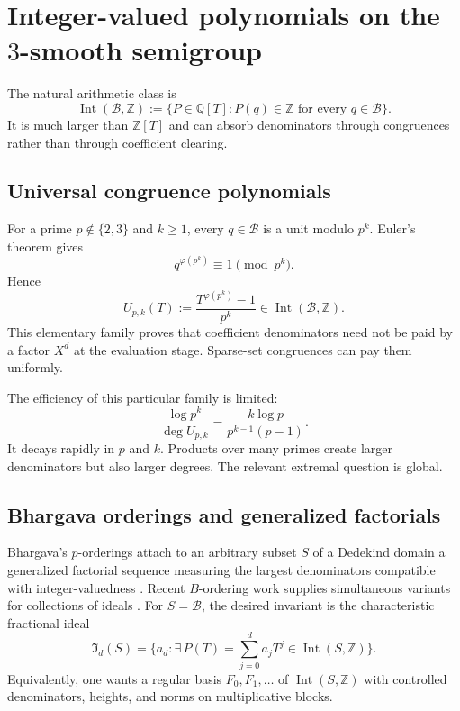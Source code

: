 \documentclass[11pt,oneside]{article}
\theoremstyle{definition}
\theoremstyle{remark}
\newcommand{\Z}{\mathbb Z}
\newcommand{\Q}{\mathbb Q}
\newcommand{\Bsem}{\mathcal B}
\newcommand{\Int}{\operatorname{Int}}
\begin{document}
\section{Integer-valued polynomials on the $3$-smooth semigroup}
\label{sec:int-valued}

The natural arithmetic class is
\begin{equation}
 \Int(\Bsem,\Z):=
 \{P\in\Q[T]:P(q)\in\Z\text{ for every }q\in\Bsem\}.
 \label{eq:int-ring}
\end{equation}
It is much larger than $\Z[T]$ and can absorb denominators through congruences rather than
through coefficient clearing.

\subsection{Universal congruence polynomials}

For a prime $p\notin\{2,3\}$ and $k\ge1$, every $q\in\Bsem$ is a unit modulo $p^k$.
Euler's theorem gives
\[
 q^{\varphi(p^k)}\equiv1\pmod{p^k}.
\]
Hence
\begin{equation}
 U_{p,k}(T):=\frac{T^{\varphi(p^k)}-1}{p^k}
 \in\Int(\Bsem,\Z).
 \label{eq:universal-congruence}
\end{equation}
This elementary family proves that coefficient denominators need not be paid by a factor
$X^d$ at the evaluation stage.  Sparse-set congruences can pay them uniformly.

The efficiency of this particular family is limited:
\[
 \frac{\log p^k}{\deg U_{p,k}}
 =\frac{k\log p}{p^{k-1}(p-1)}.
\]
It decays rapidly in $p$ and $k$.  Products over many primes create larger denominators but
also larger degrees.  The relevant extremal question is global.

\subsection{Bhargava orderings and generalized factorials}

Bhargava's $p$-orderings attach to an arbitrary subset $S$ of a Dedekind domain a generalized
factorial sequence measuring the largest denominators compatible with integer-valuedness
\cite{Bhargava1997}.  Recent $B$-ordering work supplies simultaneous variants for collections
of ideals \cite{LagariasYangjit2025}.  For $S=\Bsem$, the desired invariant is the
characteristic fractional ideal
\[
 \mathfrak I_d(S)=
 \bigl\{a_d:\exists\,P(T)=\sum_{j=0}^d a_jT^j\in\Int(S,\Z)\bigr\}.
\]
Equivalently, one wants a regular basis
$F_0,F_1,\ldots$ of $\Int(S,\Z)$ with controlled denominators, heights, and norms on
multiplicative blocks.
\end{document}
